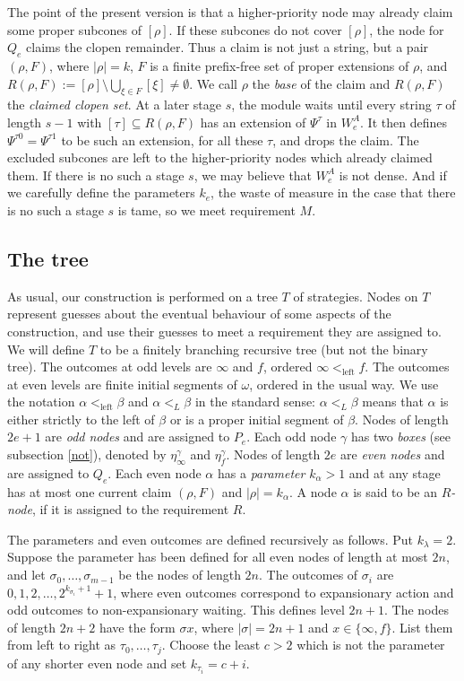 \documentclass[10pt,a4paper]{amsart}
\begin{document}
The point of the present version is that a higher-priority node may already
claim some proper subcones of $[\rho]$.  If these subcones do not cover
$[\rho]$, the node for $Q_e$ claims the clopen remainder.  Thus a claim is not
just a string, but a pair $(\rho,F)$,
where $|\rho|=k$, $F$ is a finite prefix-free set of proper extensions of
$\rho$, and $R(\rho,F):=[\rho]\setminus\bigcup_{\xi\in F}[\xi] \neq \emptyset$.
We call $\rho$ the \emph{base} of the claim and $R(\rho,F)$ the
\emph{claimed clopen set}.  At a later stage $s$, the module waits until every
string $\tau$ of length $s-1$ with $[\tau]\subseteq R(\rho,F)$ has an extension
of $\Psi^\tau$ in $W_e^A$.  It then defines $\Psi^{\tau 0}=\Psi^{\tau 1}$ to be
such an extension, for all these $\tau$, and drops the claim.  The excluded
subcones are left to the higher-priority nodes which already claimed them. If
there is no such a stage $s$, we may believe that $W_e^A$ is not dense. And if we carefully define the parameters $k_e$, the waste of measure in the case that there is no such a stage $s$ is tame, so we meet requirement $M$.

\subsection{The tree}
As usual, our construction is performed on a tree $T$ of
strategies. Nodes on $T$ represent guesses about
the eventual behaviour of some aspects of the construction, and use their
guesses to meet a requirement they are assigned to. We will define $T$ to be a finitely branching recursive tree (but not the binary tree). The
outcomes at odd levels are $\infty$ and $f$, ordered $\infty<_{\mathrm{left}}f$.
The outcomes at even levels are finite initial segments of $\omega$, ordered in
the usual way.  We use the notation $\alpha<_{\mathrm{left}}\beta$ and
$\alpha<_L\beta$ in the standard sense: $\alpha<_L\beta$ means that $\alpha$ is
either strictly to the left of $\beta$ or is a proper initial segment of
$\beta$.
Nodes of length $2e+1$ are \emph{odd nodes} and are assigned to $P_e$.  Each odd node
$\gamma$ has two \emph{boxes} (see subsection \ref{not}), denoted by $\eta_\infty^\gamma$ and $\eta_f^\gamma$.
Nodes of length $2e$ are \emph{even nodes} and are assigned to $Q_e$. Each even node
$\alpha$ has a \emph{parameter} $k_\alpha>1$ and at any stage has at most one current
claim $(\rho,F)$ and $|\rho|=k_\alpha$. A node $\alpha$ is said to be an {\emph{$R$-node}}, if it is assigned to the
requirement $R$.

The parameters and even outcomes are defined recursively as follows.  Put
$k_\lambda=2$.  Suppose the parameter has been defined for all even nodes of
length at most $2n$, and let $\sigma_0,\ldots,\sigma_{m-1}$ be the nodes of
length $2n$.  The outcomes of $\sigma_i$ are $0,1,2,\ldots, 2^{k_{\sigma_i}+1}+1$,
where even outcomes correspond to expansionary action and odd outcomes to
non-expansionary waiting.  This defines level $2n+1$.  The nodes of length
$2n+2$ have the form $\sigma x$, where $|\sigma|=2n+1$ and
$x\in\{\infty,f\}$.  List them from left to right as
$\tau_0,\ldots,\tau_j$.  Choose the least $c>2$ which is not the parameter of
any shorter even node and set $k_{\tau_i}=c+i$.
\end{document}
